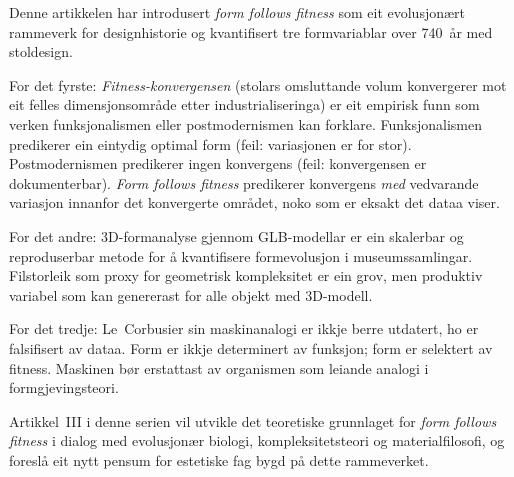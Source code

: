 \documentclass[12pt,a4paper]{article}
\begin{document}
Denne artikkelen har introdusert \emph{form follows fitness} som eit evolusjon\ae{}rt rammeverk for designhistorie og kvantifisert tre formvariablar over 740~\aa{}r med stoldesign.

For det fyrste: \emph{Fitness-konvergensen} (stolars omsluttande volum konvergerer mot eit felles dimensjonsomr\aa{}de etter industrialiseringa) er eit empirisk funn som verken funksjonalismen eller postmodernismen kan forklare. Funksjonalismen predikerer ein eintydig optimal form (feil: variasjonen er for stor). Postmodernismen predikerer ingen konvergens (feil: konvergensen er dokumenterbar). \emph{Form follows fitness} predikerer konvergens \emph{med} vedvarande variasjon innanfor det konvergerte omr\aa{}det, noko som er eksakt det dataa viser.

For det andre: 3D-formanalyse gjennom GLB-modellar er ein skalerbar og reproduserbar metode for \aa{} kvantifisere formevolusjon i museumssamlingar. Filstorleik som proxy for geometrisk kompleksitet er ein grov, men produktiv variabel som kan genererast for alle objekt med 3D-modell.

For det tredje: Le~Corbusier sin maskinanalogi er ikkje berre utdatert, ho er falsifisert av dataa. Form er ikkje determinert av funksjon; form er selektert av fitness. Maskinen b\o{}r erstattast av organismen som leiande analogi i formgjevingsteori.

Artikkel~III i denne serien vil utvikle det teoretiske grunnlaget for \emph{form follows fitness} i dialog med evolusjon\ae{}r biologi, kompleksitetsteori og materialfilosofi, og foresl\aa{} eit nytt pensum for estetiske fag bygd p\aa{} dette rammeverket.



\end{document}
